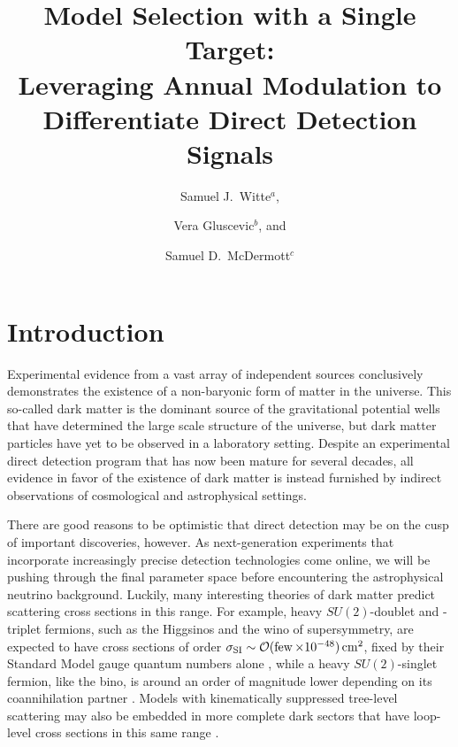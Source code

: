 \documentclass[11pt]{article}
\newcommand{\tenx}[1]{\times 10^{#1}}
\begin{document}
\title{Model Selection with a Single Target:\\Leveraging Annual Modulation to Differentiate Direct Detection Signals}
\author{Samuel J.~Witte${}^a$,}
\author{Vera Gluscevic${}^b$, and}
\author{Samuel D.~McDermott${}^c$}





\abstract{


}

\maketitle

\section{Introduction} \setcounter{page}{2}

Experimental evidence from a vast array of independent sources conclusively demonstrates the existence of a non-baryonic form of matter in the universe. This so-called dark matter is the dominant source of the gravitational potential wells that have determined the large scale structure of the universe, but dark matter particles have yet to be observed in a laboratory setting. Despite an experimental direct detection program that has now been mature for several decades, all evidence in favor of the existence of dark matter is instead furnished by indirect observations of cosmological and astrophysical settings.

There are good reasons to be optimistic that direct detection may be on the cusp of important discoveries, however. As next-generation experiments that incorporate increasingly precise detection technologies come online, we will be pushing through the final parameter space before encountering the astrophysical neutrino background. Luckily, many interesting theories of dark matter predict scattering cross sections in this range. For example, heavy $SU(2)$-doublet and -triplet fermions, such as the Higgsinos and the wino of supersymmetry, are expected to have cross sections of order $\sigma_{\rm SI} \sim \cO(\few\tenx{-48})\cm^2$, fixed by their Standard Model gauge quantum numbers alone \cite{Hill:2011be,Hill:2013hoa,Hill:2014yxa}, while a heavy $SU(2)$-singlet fermion, like the bino, is around an order of magnitude lower depending on its coannihilation partner \cite{Berlin:2015njh}. Models with kinematically suppressed tree-level scattering may also be embedded in more complete dark sectors that have loop-level cross sections in this same range \cite{Ipek:2014gua,McDermott:2014rqa,Appelquist:2015yfa,Appelquist:2015zfa}.
\end{document}
